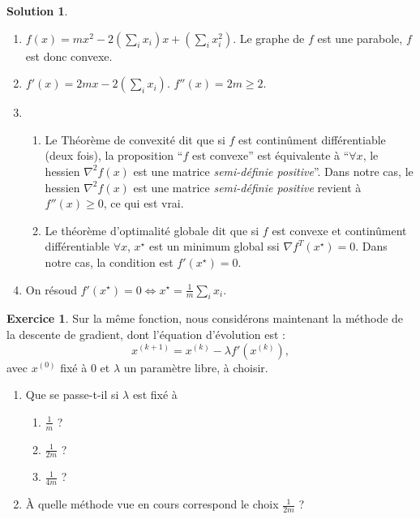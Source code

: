 \documentclass[a4paper,francais]{article}
\theoremstyle{definition}
\newtheorem{exercice}{Exercice}[section]
\newtheorem*{solution}{Solution}
\begin{document}
\begin{solution}
  \begin{enumerate}
  \item $f(x) = m x^2 - 2(\sum_ix_i)x + (\sum_ix_i^2)$.
    Le graphe de $f$ est une parabole, $f$ est donc convexe.  
  \item $f'(x) = 2m x - 2(\sum_ix_i)$. $f''(x) = 2m \geq 2$. 
  \item
    \begin{enumerate}
    \item Le Théorème de convexité dit que si $f$ est continûment différentiable (deux fois), 
      la proposition ``$f$ est convexe'' est équivalente à ``$\forall x$, le hessien $\nabla^2f(x)$
      est une matrice \emph{semi-définie positive}''. Dans notre cas, le hessien $\nabla^2f(x)$
      est une matrice \emph{semi-définie positive} revient à $f''(x) \geq 0$, ce qui est vrai.
    \item Le théorème d'optimalité globale dit que si $f$ est convexe et continûment différentiable
      $\forall x$, $x^\star$ est un minimum global ssi ${\nabla f}^T(x^\star) = 0$.
      Dans notre cas, la condition est $f'(x^\star) = 0$. 
    \end{enumerate}
  \item On résoud $f'(x^\star) = 0 \Leftrightarrow x^\star = \frac{1}{m}\sum_ix_i$.
  \end{enumerate}  
\end{solution}

\begin{exercice}  
  Sur la même fonction, nous considérons maintenant la méthode de la descente de gradient,
  dont l'équation d'évolution est :
  \[ x^{(k+1)} = x^{(k)} - \lambda f'(x^{(k)}), \]
  avec $x^{(0)}$ fixé à $0$ et $\lambda$ un paramètre libre, à choisir. 
  \begin{enumerate}
  \item Que se passe-t-il si $\lambda$ est fixé à
    \begin{enumerate}
    \item $\frac{1}{m}$ ?
    \item $\frac{1}{2m}$ ?
    \item $\frac{1}{4m}$ ?
    \end{enumerate}
  \item \`A quelle méthode vue en cours correspond le choix $\frac{1}{2m}$ ?
  \end{enumerate}
\end{exercice}
\end{document}
